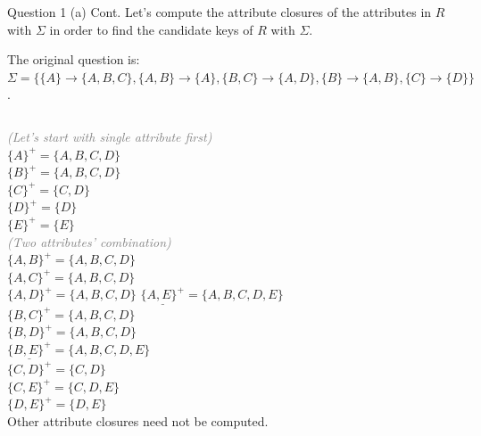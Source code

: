 \begin{frame}[fragile]{Question 1 (a) Cont.}
Let's compute the attribute closures of the attributes in $R$ with $\Sigma$ in order to find the candidate keys of $R$ with $\Sigma$. \vspace{15pt}

The original question is:\\ $\Sigma=\{\{A\} \rightarrow \{A, B, C\}, \{A, B\} \rightarrow \{A\}, \{B, C\} \rightarrow \{A, D\}, \{B\} \rightarrow \{A, B\}, \{C\} \rightarrow \{D\}\}$.\\\vspace{5pt} 

\begin{columns}[t]
	\textcolor{gray}{\scriptsize \textit{(Let's start with single attribute first)}}\\
	$\{A\}^{+}= \{A, B, C, D\}$\\	
	$\{B\}^{+}= \{A, B, C, D\}$\\	
	$\{C\}^{+}= \{C, D\}$\\
	$\{D\}^{+}= \{D\}$\\
	$\{E\}^{+}= \{E\}$\\ \vspace{5pt}
	\textcolor{gray}{\textit{\scriptsize (Two attributes' combination)}}\\
	$\{A, B\}^{+}= \{A, B, C, D\}$\\
	$\{A, C\}^{+}= \{A, B, C, D\}$\\
	$\{A, D\}^{+}= \{A, B, C, D\}$
	$\underline{\{A, E\}^{+}}= \{A, B, C, D, E\}$\\
	$\{B, C\}^{+}= \{A, B, C, D\}$\\
	$\{B, D\}^{+}= \{A, B, C, D\}$\\
	$\underline{\{B, E\}^{+}}= \{A, B, C, D, E\}$\\
	$\{C, D\}^{+}= \{C, D\}$\\
	$\{C, E\}^{+}= \{C, D, E\}$\\
	$\{D, E\}^{+}= \{D, E\}$\\ \vspace{5pt}
	Other attribute closures need not be computed.
\end{columns}
\end{frame}

